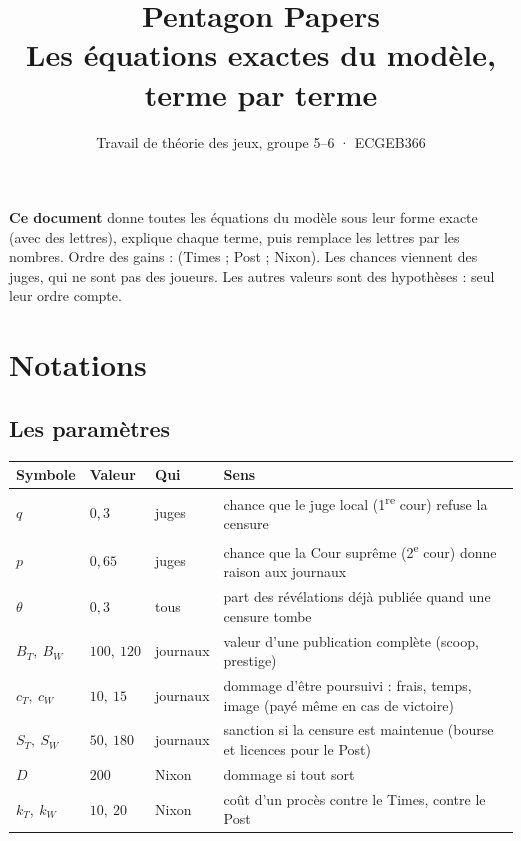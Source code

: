 \documentclass[11pt,a4paper]{article}
\title{\textbf{Pentagon Papers}\\[3pt]\large Les équations exactes du modèle, terme par terme}
\author{Travail de théorie des jeux, groupe 5--6 · ECGEB366}
\date{}
\theoremstyle{definition}
\newcommand{\T}[1]{\textcolor{nyt}{#1}}
\newcommand{\W}[1]{\textcolor{wp}{#1}}
\newcommand{\N}[1]{\textcolor{gov}{#1}}
\begin{document}
\maketitle
\vspace{-1.2cm}

\begin{resultat}
\textbf{Ce document} donne toutes les équations du modèle sous leur forme exacte (avec des lettres), explique chaque terme, puis remplace les lettres par les nombres. Ordre des gains : (\T{Times} ; \W{Post} ; \N{Nixon}). Les chances viennent des juges, qui ne sont pas des joueurs. Les autres valeurs sont des hypothèses : seul leur ordre compte.
\end{resultat}

\section{Notations}

\subsection{Les paramètres}
\begin{center}
\small
\begin{tabular}{@{}lllp{8.3cm}@{}}
\toprule
Symbole & Valeur & Qui & Sens \\
\midrule
$q$ & $0,3$ & juges & chance que le juge local (1\textsuperscript{re} cour) refuse la censure \\
$p$ & $0,65$ & juges & chance que la Cour suprême (2\textsuperscript{e} cour) donne raison aux journaux \\
$\theta$ & $0,3$ & tous & part des révélations déjà publiée quand une censure tombe \\
$B_T,\ B_W$ & $100,\ 120$ & journaux & valeur d'une publication complète (scoop, prestige) \\
$c_T,\ c_W$ & $10,\ 15$ & journaux & dommage d'être poursuivi : frais, temps, image (payé même en cas de victoire) \\
$S_T,\ S_W$ & $50,\ 180$ & journaux & sanction si la censure est maintenue (bourse et licences pour le Post) \\
$D$ & $200$ & Nixon & dommage si tout sort \\
$k_T,\ k_W$ & $10,\ 20$ & Nixon & coût d'un procès contre le Times, contre le Post \\
\bottomrule
\end{tabular}
\end{center}
\end{document}

